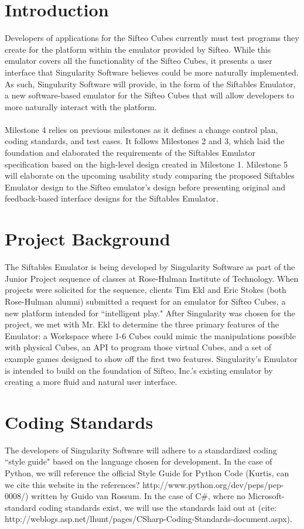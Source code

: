 \documentclass[12pt]{article}
\begin{document}
\section{Introduction}
Developers of applications for the \gls{Sifteo Cubes} currently must test programs they create for the platform within the emulator provided by Sifteo. While this emulator covers all  the functionality of the Sifteo Cubes, it presents a user interface that Singularity Software believes could be more naturally implemented. As such, Singularity Software will provide, in the form of the Siftables Emulator, a new software-based emulator for the Sifteo Cubes that will allow developers to more naturally interact with the platform.\\\\
Milestone 4 relies on previous milestones as it defines a change control plan, coding standards, and test cases. It follows Milestones 2 and 3, which laid the foundation and elaborated the requirements of the Siftables Emulator specification based on the high-level design created in Milestone 1. Milestone 5 will elaborate on the upcoming usability study comparing the proposed Siftables Emulator design to the Sifteo emulator's design before presenting original and feedback-based interface designs for the Siftables Emulator.

\section{Project Background}
The Siftables Emulator is being developed by Singularity Software as part of the Junior Project sequence of classes at Rose-Hulman Institute of Technology. When projects were solicited for the sequence, clients Tim Ekl and Eric Stokes (both Rose-Hulman alumni) submitted a request for an emulator for Sifteo Cubes, a new platform intended for ``intelligent play." After Singularity was chosen for the project, we met with Mr. Ekl to determine the three primary features of the Emulator: a Workspace where 1-6 Cubes could mimic the manipulations possible with physical Cubes, an \gls{API} to program those virtual Cubes, and a set of example games designed to show off the first two features. Singularity's Emulator is intended to build on the foundation of Sifteo, Inc.'s existing emulator by creating a more fluid and natural user interface.

\section{Coding Standards}
The developers of Singularity Software will adhere to a standardized coding ``style guide" based on the language chosen for development. In the case of Python, we will reference the official Style Guide for Python Code (Kurtis, can we cite this website in the references? http://www.python.org/dev/peps/pep-0008/) written by Guido van Rossum. In the case of C\#, where no Microsoft-standard coding standards exist, we will use the standards laid out at (cite: http://weblogs.asp.net/lhunt/pages/CSharp-Coding-Standards-document.aspx).
\end{document}
